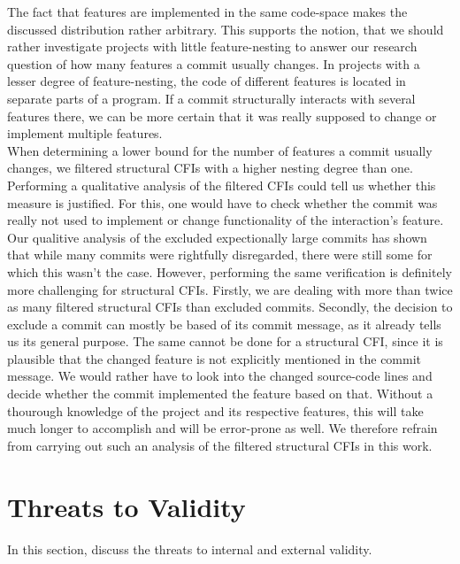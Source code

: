 The fact that features are implemented in the same code-space makes the discussed distribution rather arbitrary.
This supports the notion, that we should rather investigate projects with little feature-nesting to answer our research question of how many features a commit usually changes.
In projects with a lesser degree of feature-nesting, the code of different features is located in separate parts of a program.
If a commit structurally interacts with several features there, we can be more certain that it was really supposed to change or implement multiple features. \\
When determining a lower bound for the number of features a commit usually changes, we filtered structural CFIs with a higher nesting degree than one.
Performing a qualitative analysis of the filtered CFIs could tell us whether this measure is justified.
For this, one would have to check whether the commit was really not used to implement or change functionality of the interaction's feature.
Our qualitive analysis of the excluded expectionally large commits has shown that while many commits were rightfully disregarded, there were still some for which this wasn't the case.
However, performing the same verification is definitely more challenging for structural CFIs.
Firstly, we are dealing with more than twice as many filtered structural CFIs than excluded commits.
Secondly, the decision to exclude a commit can mostly be based of its commit message, as it already tells us its general purpose.
The same cannot be done for a structural CFI, since it is plausible that the changed feature is not explicitly mentioned in the commit message.
We would rather have to look into the changed source-code lines and decide whether the commit implemented the feature based on that.
Without a thourough knowledge of the project and its respective features, this will take much longer to accomplish and will be error-prone as well.
We therefore refrain from carrying out such an analysis of the filtered structural CFIs in this work. \\

\iffalse In the previous section, we mentioned that the number of instructions per interacting commit of a feature varies between projects.
Since instructions stem from source-code lines, their respective amount can in turn indicate the number of lines they stem from.
Thus, we can derive that the lines of code a commit usually changes or contributes to a feature likely differs between projects as well.
Disregarding \textsc{bzip2}, the number of instructions per commit range from 13 to 48.
Given that a single source-code line generally produces several llvm-IR instructions, we can predict the number of lines per commit to be below 10.
This is a surprsingly low amount indicating that a commit often only introduces small changes to a feature.
Of course, this is just a rough, and perhaps inaccurate, prediction, but it shows that our generated data can be used for many applications. \fi

\section{Threats to Validity}\label{sec:threats}

In this section, discuss the threats to internal and external validity.

